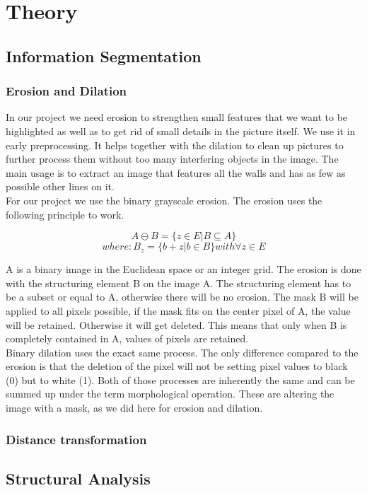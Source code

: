 \section{Theory}
\subsection{Information Segmentation}
\subsubsection{Erosion and Dilation}
In our project we need erosion to strengthen small features that we want to be highlighted as well as to get rid of small details in the picture itself. We use it in early preprocessing. It helps together with the dilation to clean up pictures to further process them without too many interfering objects in the image. The main usage is to extract an image that features all the walls and has as few as possible other lines on it.
\\
For our project we use the binary grayscale erosion.
The erosion uses the following principle to work.


\[A \ominus B = \{ z\in E | B \subseteq A \}\]  
\[where: B_{z} = \{b+z | b \in B\} with \forall z \in E \]

A is a binary image in the Euclidean space or an integer grid. The erosion is done with the structuring element B on the image A. The structuring element has to be a subset or equal to A, otherwise there will be no erosion. The mask B will be applied to all pixels possible, if the mask fits on the center pixel of A, the value will be retained. Otherwise it will get deleted. This means that only when B is completely contained in A, values of pixels are retained.
\\
Binary dilation uses the exact same process. The only difference compared to the erosion is that the deletion of the pixel will not be setting pixel values to black (0) but to white (1). Both of those processes are inherently the same and can be summed up under the term morphological operation. These are altering the image with a mask, as we did here for erosion and dilation.




\subsubsection{Distance transformation}
\subsection{Structural Analysis}
